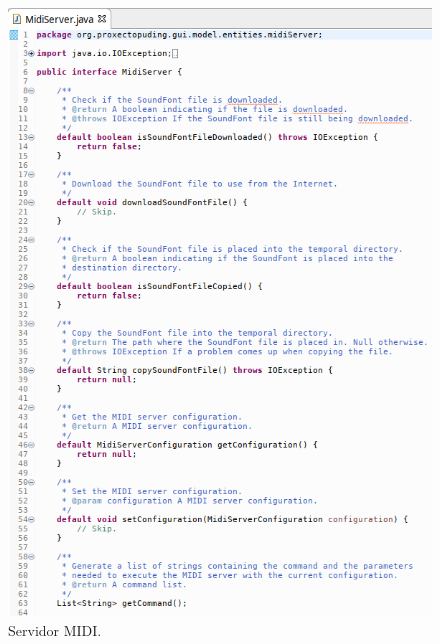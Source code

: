    \begin{figure}[htbp]
    \centering
    \includegraphics[scale=0.6, keepaspectratio=true]{./imagenes/midi-server.png}
    \caption{Servidor MIDI.}
    \label{figura:MidiServer}
   \end{figure}
   
